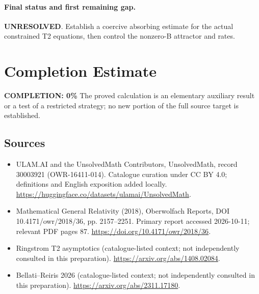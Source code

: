 \documentclass[11pt]{article}
\begin{document}
\paragraph{Final status and first remaining gap.}
\textbf{UNRESOLVED}. Establish a coercive absorbing estimate for the actual constrained T2 equations, then control the nonzero-B attractor and rates.

\section{Completion Estimate}
\noindent\textbf{COMPLETION: 0\%}
The proved calculation is an elementary auxiliary result or a test of a restricted strategy; no new portion of the full source target is established.

\subsection{Sources}
\begin{itemize}
\item[\hypertarget{source:30003921:1}{S1}] ULAM.AI and the UnsolvedMath Contributors, UnsolvedMath, record 30003921 (OWR-16411-014). Catalogue curation under CC BY 4.0; definitions and English exposition added locally.
\url{https://huggingface.co/datasets/ulamai/UnsolvedMath}.
\item[\hypertarget{source:30003921:2}{S2}] Mathematical General Relativity (2018), Oberwolfach Reports, DOI 10.4171/owr/2018/36, pp. 2157--2251. Primary report accessed 2026-10-11; relevant PDF pages 87.
\url{https://doi.org/10.4171/owr/2018/36}.
\item[\hypertarget{source:30003921:3}{S3}] Ringstrom T2 asymptotics (catalogue-listed context; not independently consulted in this preparation).
\url{https://arxiv.org/abs/1408.02084}.
\item[\hypertarget{source:30003921:4}{S4}] Bellati--Reiris 2026 (catalogue-listed context; not independently consulted in this preparation).
\url{https://arxiv.org/abs/2311.17180}.
\end{itemize}
\label{end:30003921}
\end{document}
